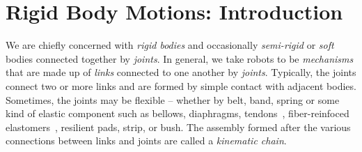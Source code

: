 \chapter{Rigid Body Motions: Introduction}  
 \label{chap:back}
 
 We are chiefly concerned with \textit{rigid bodies} and occasionally \textit{semi-rigid} or \textit{soft} bodies connected together by \textit{joints}.   In general, we take robots to be \textit{mechanisms} that are made up of \textit{links} connected to one another by \textit{joints}.  Typically, the joints connect two or more links and are formed by simple contact with adjacent bodies.  Sometimes, the joints may be flexible -- whether by belt, band, spring or some kind of elastic component such as bellows, diaphragms, tendons~\cite{Bern17ACM}, fiber-reinfoced elastomers~\cite{BishopFREE2012}, resilient pads, strip, or bush. The assembly formed after the various connections between links and joints are called  a \textit{kinematic chain}. 
 
